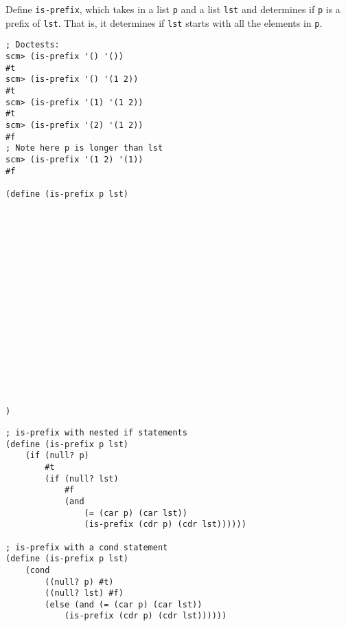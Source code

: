 \begin{blocksection}
\question Define \lstinline$is-prefix$, which takes in a list \lstinline$p$ and a list \lstinline$lst$ and determines 
if \lstinline$p$ is a prefix of \lstinline$lst$.
That is, it determines if \lstinline$lst$ starts with all the elements in \lstinline$p$.

\begin{lstlisting}
; Doctests:
scm> (is-prefix '() '())
#t
scm> (is-prefix '() '(1 2))
#t
scm> (is-prefix '(1) '(1 2))
#t
scm> (is-prefix '(2) '(1 2))
#f
; Note here p is longer than lst
scm> (is-prefix '(1 2) '(1))
#f

(define (is-prefix p lst)


















)
\end{lstlisting}
\end{blocksection}

\begin{blocksection}
\begin{solution}[.25in]
\begin{lstlisting}
; is-prefix with nested if statements
(define (is-prefix p lst)
    (if (null? p)
        #t
        (if (null? lst)
            #f
            (and
                (= (car p) (car lst))
                (is-prefix (cdr p) (cdr lst))))))

; is-prefix with a cond statement
(define (is-prefix p lst)
    (cond 
        ((null? p) #t)
        ((null? lst) #f)
        (else (and (= (car p) (car lst))
            (is-prefix (cdr p) (cdr lst))))))
 
\end{lstlisting}
\end{solution}
\end{blocksection}
